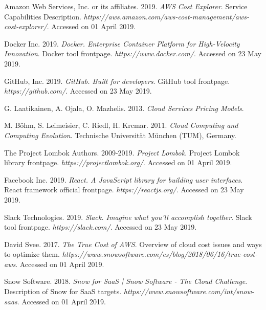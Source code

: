\documentclass[licencjacka,en]{thesisclass}
\begin{document}
\begin{thebibliography}{99}
        Amazon Web Services, Inc. or its affiliates. 2019.
        \textit{AWS Cost Explorer}.
        Service Capabilities Description.
        \textit{https://aws.amazon.com/aws-cost-management/aws-cost-explorer/}.
        Accessed on 01 April 2019.

        Docker Inc. 2019.
        \textit{Docker. Enterprise Container Platform for High-Velocity Innovation}.
        Docker tool frontpage.
        \textit{https://www.docker.com/}.
        Accessed on 23 May 2019.

        GitHub, Inc. 2019.
        \textit{GitHub. Built for developers}.
        GitHub tool frontpage.
        \textit{https://github.com/}.
        Accessed on 23 May 2019.

        G. Laatikainen, A. Ojala, O. Mazhelis. 2013.
        \textit{Cloud Services Pricing Models}.

        M. Böhm, S. Leimeisier, C. Riedl, H. Krcmar. 2011.
        \textit{Cloud Computing and Computing Evolution}.
        Technische Universität München (TUM), Germany.

        The Project Lombok Authors. 2009-2019.
        \textit{Project Lombok}.
        Project Lombok library frontpage.
        \textit{https://projectlombok.org/}.
        Accessed on 01 April 2019.

        Facebook Inc. 2019.
        \textit{React. A JavaScript library for building user interfaces}.
        React framework official frontpage.
        \textit{https://reactjs.org/}.
        Accessed on 23 May 2019.

        Slack Technologies. 2019.
        \textit{Slack. Imagine what you’ll accomplish together}.
        Slack tool frontpage.
        \textit{https://slack.com/}.
        Accessed on 23 May 2019.

        David Svee. 2017.
        \textit{The True Cost of AWS}.
        Overview of cloud cost issues and ways to optimize them.
        \textit{https://www.snowsoftware.com/es/blog/2018/06/16/true-cost-aws}.
        Accessed on 01 April 2019.

        Snow Software. 2018.
        \textit{Snow for SaaS | Snow Software - The Cloud Challenge}.
        Description of Snow for SaaS targets.
        \textit{https://www.snowsoftware.com/int/snow-saas}.
        Accessed on 01 April 2019.


\end{thebibliography}
\end{document}
